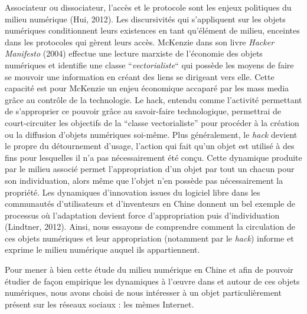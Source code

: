 {\color{black}
Associateur ou dissociateur, l'acc\`es et le protocole sont les enjeux politiques du milieu num\'erique (Hui, 2012). Les
discursivit\'es qui s'appliquent sur les objets num\'eriques conditionnent leurs existences en tant qu'\'el\'ement de
milieu, enceintes dans les protocoles qui g\`erent leurs acc\`es. McKenzie dans son livre \textit{Hacker Manifesto}
(2004) effectue une lecture marxiste de l'\'economie des objets num\'eriques et identifie une classe
``\textit{vectorialiste}{}`` qui poss\`ede les moyens de faire se mouvoir une information en cr\'eant des liens se
dirigeant vers elle. Cette capacit\'e est pour McKenzie un enjeu \'economique accapar\'e par les mass media gr\^ace au
contr\^ole de la technologie. Le hack, entendu comme l'activit\'e permettant de s'approprier ce pouvoir gr\^ace au
savoir-faire technologique, permettrai de court-circuiter les objectifs de la ``classe vectorialiste'' pour proc\'eder
\`a la cr\'eation ou la diffusion d'objets num\'eriques soi-m\^eme. Plus g\'en\'eralement, le \textit{hack }devient le
propre du d\'etournement d'usage, l'action qui fait qu'un objet est utilis\'e \`a des fins pour lesquelles il n'a pas
n\'ecessairement \'et\'e con\c{c}u. Cette dynamique produite par le milieu associ\'e permet l'appropriation d'un objet
par tout un chacun pour son individuation, alors m\^eme que l'objet n'en poss\`ede pas n\'ecessairement la
propri\'et\'e. Les dynamiques d'innovation issues du logiciel libre dans les communaut\'es d'utilisateurs et
d'inventeurs en Chine donnent un bel exemple de processus o\`u l'adaptation devient force d'appropriation puis
d'individuation (Lindtner, 2012). Ainsi, nous essayons de comprendre comment la circulation de ces objets num\'eriques
et leur appropriation (notamment par le \textit{hack}) informe et exprime le milieu num\'erique auquel ils
appartiennent. }


\bigskip


\bigskip

{\color{black}
Pour mener \`a bien cette \'etude du milieu num\'erique en Chine et afin de pouvoir \'etudier de fa\c{c}on empirique les
dynamiques \`a l'{\oe}uvre dans et autour de ces objets num\'eriques, nous avons choisi de nous int\'eresser \`a un
objet particuli\`erement pr\'esent sur les r\'eseaux sociaux : les m\`emes Internet. }


\bigskip


\bigskip

